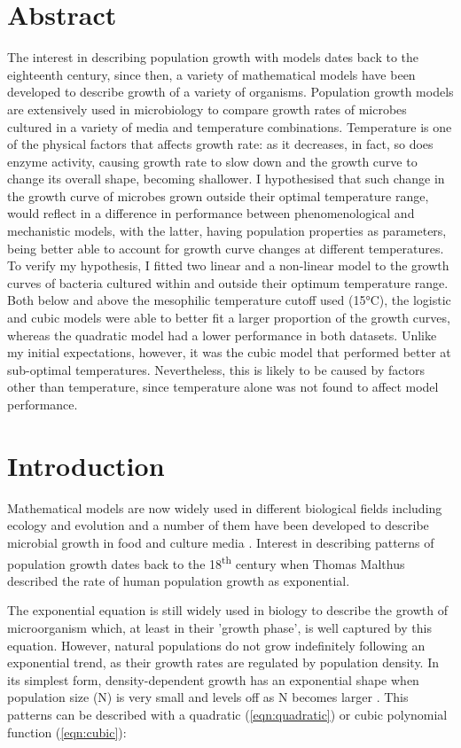 \documentclass[a4paper]{article}
\begin{document}
\section{Abstract}
The interest in describing population growth with models dates back to the eighteenth century, since then, a variety of mathematical models have been developed to describe growth of a variety of organisms. Population growth models are extensively used in microbiology to compare growth rates of microbes cultured in a variety of media and temperature combinations. Temperature is one of the physical factors that affects growth rate: as it decreases, in fact, so does enzyme activity, causing growth rate to slow down and the growth curve to change its overall shape, becoming shallower. I hypothesised that such change in the growth curve of microbes grown outside their optimal temperature range, would reflect in a difference in performance between phenomenological and mechanistic models, with the latter, having population properties as parameters, being better able to account for growth curve changes at different temperatures. To verify my hypothesis, I fitted two linear and a non-linear model to the growth curves of bacteria cultured within and outside their optimum temperature range. Both below and above the mesophilic temperature cutoff used (15°C), the logistic and cubic models were able to better fit a larger proportion of the growth curves, whereas the quadratic model had a lower performance in both datasets. Unlike my initial expectations, however, it was the cubic model that performed better at sub-optimal temperatures. Nevertheless, this is likely to be caused by factors other than temperature, since temperature alone was not found to affect model performance.

\pagebreak

\section{Introduction}
Mathematical models are now widely used in different biological fields including ecology and evolution \citep{johnson2004model} and a number of them have been developed to describe microbial growth in food and culture media \citep{Fujikawa2004ANL}. Interest in describing patterns of population growth dates back to the 18\textsuperscript{th} century when Thomas Malthus described the rate of human population growth as exponential.\par
The exponential equation is still widely used in biology to describe the growth of microorganism which, at least in their 'growth phase', is well captured by this equation. However, natural populations do not grow indefinitely following an exponential trend, as their growth rates are regulated by population density. In its simplest form, density-dependent growth has an exponential shape when population size (N) is very small and levels off as N becomes larger \citep{HASTINGS2013175}. This patterns can be described with a quadratic (\ref{eqn:quadratic})  or cubic polynomial function (\ref{eqn:cubic}):
\end{document}
